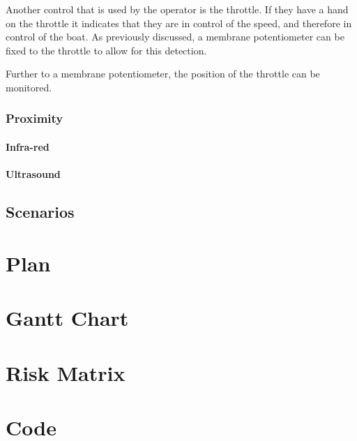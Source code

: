 \documentclass[10pt]{ecsprogressreport}
\begin{document}
Another control that is used by the operator is the throttle. If they have a hand on the throttle it indicates that they are in control of the speed, and therefore in control of the boat. As previously discussed, a membrane potentiometer can be fixed to the throttle to allow for this detection.

Further to a membrane potentiometer, the position of the throttle can be monitored. 

\subsection{Proximity}

\subsubsection{Infra-red}

\subsubsection{Ultrasound}

\section{Scenarios}

\chapter{Plan}

\begin{appendices}

\chapter{Gantt Chart}

\chapter{Risk Matrix}

\chapter{Code}

\end{appendices}



\end{document}
